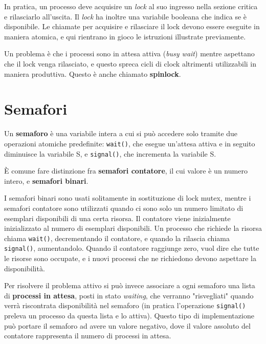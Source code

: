     In pratica, un processo deve acquisire un \textit{lock} al suo ingresso nella sezione critica e rilasciarlo all'uscita. Il \textit{lock} ha inoltre una variabile booleana che indica se è disponibile. Le chiamate per acquisire e rilasciare il lock devono essere eseguite in maniera atomica, e qui rientrano in gioco le istruzioni illustrate previamente.
    
    Un problema è che i processi sono in attesa attiva (\textit{busy wait}) mentre aspettano che il lock venga rilasciato, e questo spreca cicli di clock altrimenti utilizzabili in maniera produttiva. Questo è anche chiamato \textbf{spinlock}.
    
\section{Semafori}
    Un \textbf{semaforo} è una variabile intera a cui si può accedere solo tramite due operazioni atomiche predefinite: \texttt{wait()}, che esegue un'attesa attiva e in seguito diminuisce la variabile S, e \texttt{signal()}, che incrementa la variabile S.
    
    È comune fare distinzione fra \textbf{semafori contatore}, il cui valore è un numero intero, e \textbf{semafori binari}.
    
    I semafori binari sono usati solitamente in sostituzione di lock mutex, mentre i semafori contatore sono utilizzati quando ci sono solo un numero limitato di esemplari disponibili di una certa risorsa. Il contatore viene inizialmente inizializzato al numero di esemplari disponibili. Un processo che richiede la risorsa chiama \texttt{wait()}, decrementando il contatore, e quando la rilascia chiama \texttt{signal()}, aumentandolo. Quando il contatore raggiunge zero, vuol dire che tutte le risorse sono occupate, e i nuovi processi che ne richiedono devono aspettare la disponibilità.
    
    Per risolvere il problema attivo si può invece associare a ogni semaforo una lista di \textbf{processi in attesa}, posti in stato \textit{waiting}, che verranno "risvegliati" quando verrà riscontrata disponibilità nel semaforo (in pratica l'operazione \texttt{signal()} preleva un processo da questa lista e lo attiva). Questo tipo di implementazione può portare il semaforo ad avere un valore negativo, dove il valore assoluto del contatore rappresenta il numero di processi in attesa.